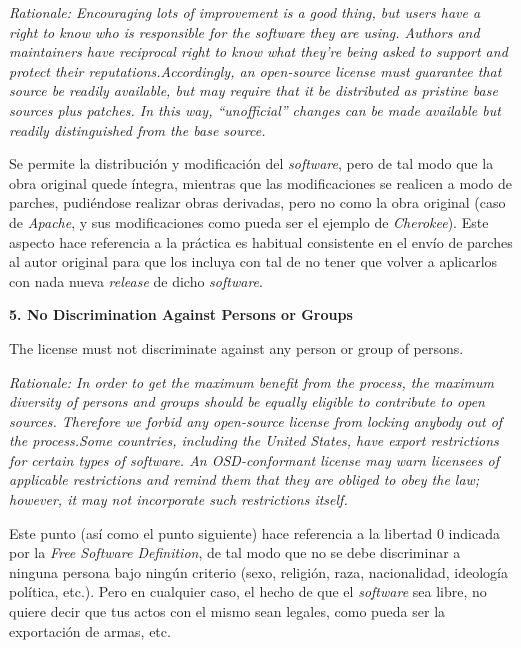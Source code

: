 \textit{Rationale: Encouraging lots of improvement is a good thing, but users
have a right to know who is responsible for the software they are using. Authors
and maintainers have reciprocal right to know what they're being asked to
support and protect their reputations.\newline Accordingly, an open-source
license must guarantee that source be readily available, but may require that it
be distributed as pristine base sources plus patches. In this way,
``unofficial'' changes can be made available but readily distinguished from the
base source.}\vspace{0.4cm}

Se permite la distribución y modificación del \textit{software}, pero de tal
modo que la obra original quede íntegra, mientras que las modificaciones se
realicen a modo de parches, pudiéndose realizar obras derivadas, pero no como la
obra original (caso de \textit{Apache}, y sus modificaciones como pueda ser el
ejemplo de \textit{Cherokee}). Este aspecto hace referencia a la práctica es
habitual consistente en el envío de parches al autor original para que los
incluya con tal de no tener que volver a aplicarlos con nada nueva
\textit{release} de dicho \textit{software}.\vspace{0.4cm}

{\bf 5. No Discrimination Against Persons or Groups

The license must not discriminate against any person or group of persons.}

\textit{Rationale: In order to get the maximum benefit from the process, the
maximum diversity of persons and groups should be equally eligible to contribute
to open sources. Therefore we forbid any open-source license from locking
anybody out of the process.\newline Some countries, including the United States,
have export restrictions for certain types of software. An OSD-conformant
license may warn licensees of applicable restrictions and remind them that they
are obliged to obey the law; however, it may not incorporate such restrictions
itself.}\vspace{0.4cm}

Este punto (así como el punto siguiente) hace referencia a la libertad 0
indicada por la \textit{Free Software Definition}, de tal modo que no se debe
discriminar a ninguna persona bajo ningún criterio (sexo, religión, raza,
nacionalidad, ideología política, etc.). Pero en cualquier caso, el hecho de que
el \textit{software} sea libre, no quiere decir que tus actos con el mismo sean
legales, como pueda ser la exportación de armas, etc.\vspace{0.4cm}

